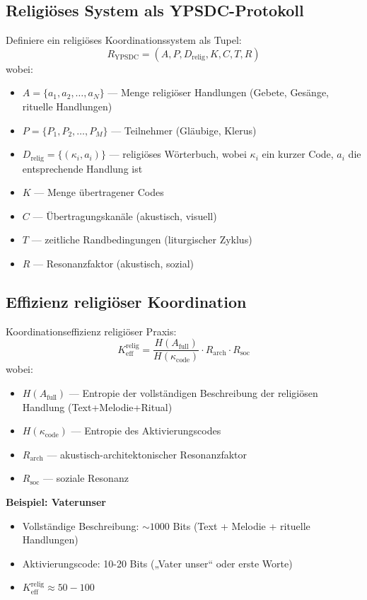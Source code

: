\documentclass[12pt,a4paper]{article}
\begin{document}
	\subsection{Religiöses System als YPSDC-Protokoll}
	
	Definiere ein religiöses Koordinationssystem als Tupel:
	\[
	R_{\mathrm{YPSDC}} = (A, P, D_{\mathrm{relig}}, K, C, T, R)
	\]
	wobei:
	\begin{itemize}
		\item $A = \{a_1, a_2, \ldots, a_N\}$ — Menge religiöser Handlungen (Gebete, Gesänge, rituelle Handlungen)
		\item $P = \{P_1, P_2, \ldots, P_M\}$ — Teilnehmer (Gläubige, Klerus)
		\item $D_{\mathrm{relig}} = \{(\kappa_i, a_i)\}$ — religiöses Wörterbuch, wobei $\kappa_i$ ein kurzer Code, $a_i$ die entsprechende Handlung ist
		\item $K$ — Menge übertragener Codes
		\item $C$ — Übertragungskanäle (akustisch, visuell)
		\item $T$ — zeitliche Randbedingungen (liturgischer Zyklus)
		\item $R$ — Resonanzfaktor (akustisch, sozial)
	\end{itemize}
	
	\subsection{Effizienz religiöser Koordination}
	
	Koordinationseffizienz religiöser Praxis:
	\[
	K_{\mathrm{eff}}^{\mathrm{relig}} = \frac{H(A_{\mathrm{full}})}{H(\kappa_{\mathrm{code}})} \cdot R_{\mathrm{arch}} \cdot R_{\mathrm{soc}}
	\]
	wobei:
	\begin{itemize}
		\item $H(A_{\mathrm{full}})$ — Entropie der vollständigen Beschreibung der religiösen Handlung (Text+Melodie+Ritual)
		\item $H(\kappa_{\mathrm{code}})$ — Entropie des Aktivierungscodes
		\item $R_{\mathrm{arch}}$ — akustisch-architektonischer Resonanzfaktor
		\item $R_{\mathrm{soc}}$ — soziale Resonanz
	\end{itemize}
	
	\textbf{Beispiel: Vaterunser}
	\begin{itemize}
		\item Vollständige Beschreibung: $\sim 1000$ Bits (Text + Melodie + rituelle Handlungen)
		\item Aktivierungscode: 10-20 Bits („Vater unser“ oder erste Worte)
		\item $K_{\mathrm{eff}}^{\mathrm{relig}} \approx 50-100$
	\end{itemize}
	
\end{document}
